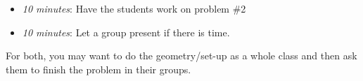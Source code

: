 \documentclass[handout,nooutcomes]{ximera}
\begin{document}
	\begin{itemize}
	
	\item  \emph{10 minutes}:  Have the students work on problem \#2
		
	\item  \emph{10 minutes}:  Let a group present if there is time.
			
	\end{itemize}
	
For both, you may want to do the geometry/set-up as a whole class and then ask them to finish the problem in their groups.
	
	
	

	
	
	

	
	

	
	
	

	
	
	
\end{document}
